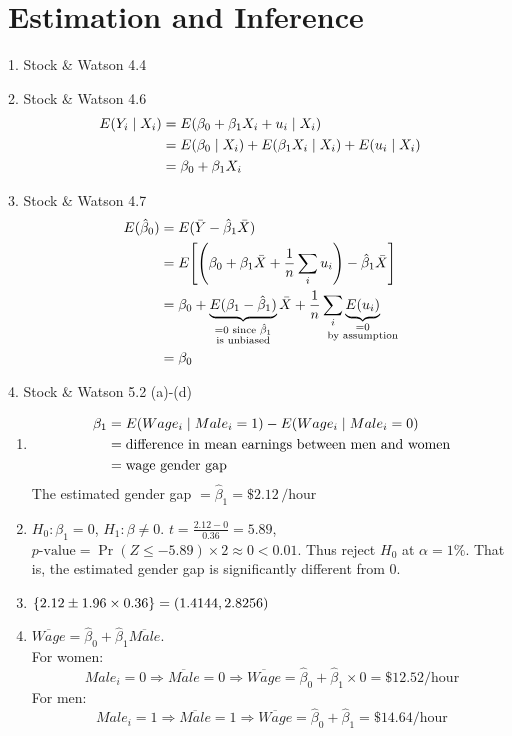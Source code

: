 \documentclass[12pt]{article}
\DeclarePairedDelimiter{\set}{\lbrace}{\rbrace}
\DeclarePairedDelimiter{\paren}{(}{)}
\DeclarePairedDelimiter{\sqbrac}{[}{]}
\begin{document}
\section{Estimation and Inference}
1. Stock \& Watson 4.4



2. Stock \& Watson 4.6 
\begin{align*}
  E(Y_i\given X_i)&=E(\beta_0+\beta_1X_i+u_i\given X_i) \\
  &=E(\beta_0\given X_i)+E(\beta_1X_i\given X_i)+E(u_i\given X_i) \\
  &=\beta_0+\beta_1X_i
\end{align*}



3. Stock \& Watson 4.7
\begin{align*}
  E(\hat\beta_0)&=E(\bar Y-\hat\beta_1\bar X) \\
  &=E\sqbrac*{\paren*{\beta_0+\beta_1\bar X+\frac1n \sum_i u_i}-\hat\beta_1\bar X}\\
  &=\beta_0+\underbrace{E(\beta_1-\hat\beta_1)}_{\mathclap{\substack{=0\text{ since $\hat\beta_1$}\\\text{is unbiased}}}}\bar X +\frac1n\sum_i \underbrace{E(u_i)}_{\mathclap{\substack{=0\\\text{by assumption}}}}\\
  &=\beta_0
\end{align*}



4. Stock \& Watson 5.2 (a)-(d)
\begin{enumerate}
  \item 
  \begin{align*}
    \beta_1&=E(Wage_i\given Male_i=1)-E(Wage_i\given Male_i=0)\\
    &=\text{difference in mean earnings between men and women}\\
    &=\text{wage gender gap}
  \end{align*}
  The estimated gender gap $=\hat\beta_1=\$2.12\,\text{/hour}$
  
  \item $H_0:\beta_1=0$, $H_1:\beta\ne0$. $t=\frac{2.12-0}{0.36}=5.89$, $p\text{-value}=\Pr(Z\le -5.89)\times2\approx0<0.01$.
  Thus reject $H_0$ at $\alpha=1\%$.
  That is, the estimated gender gap is significantly different from 0.
  
  \item $\set{2.12\pm1.96\times0.36}=(1.4144,2.8256)$
  
  \item $\overline{Wage}=\hat\beta_0+\hat\beta_1\overline{Male}$. \\
  For women:
  \begin{equation*}
    Male_i=0\Rightarrow\overline{Male}=0\Rightarrow\overline{Wage}=\hat\beta_0+\hat\beta_1\times0=\$12.52\text{/hour}
  \end{equation*}
  For men:
  \begin{equation*}
    Male_i=1\Rightarrow\overline{Male}=1\Rightarrow\overline{Wage}=\hat\beta_0+\hat\beta_1=\$14.64\text{/hour}
  \end{equation*} 
\end{enumerate}
\end{document}
